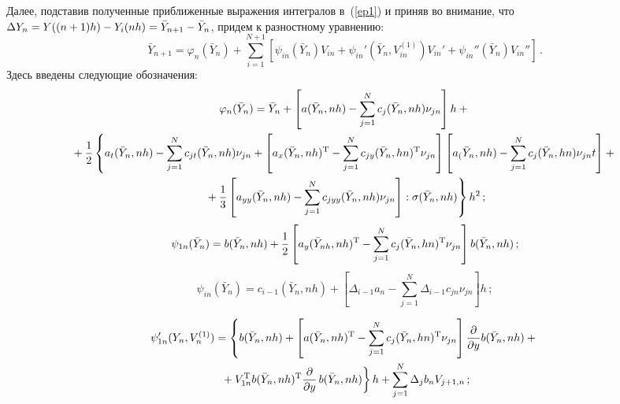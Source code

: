 {Далее, подставив полученные приближенные выражения интегралов в~(\ref{ep1}) и приняв во внимание, что $\Delta
Y_n\hm=Y((n+1)h)\hm-Y_i(nh)\hm=\bar Y_{n+1}\hm-\bar Y_ n$,
придем к разностному уравнению:
    \begin{equation}
    \bar Y_{n+1}=\varphi_n(\bar Y_n)+\sum\limits_{i=1}^{N+1}
    \left[\psi_{in}(\bar Y_n)V_{in}+
    \psi_{in}'(\bar Y_n,V_{in}^{(1)})V_{in}'+\psi_{in}''({\bar
    Y}_n)V_{in}''\right]\,.\label{ep20}
    \end{equation}
Здесь введены следующие обозначения:
    \begin{multline}
    \varphi_n(\bar Y_n)=\bar Y_n+\left[a(\bar Y_n,nh)-\sum\limits_{j=1}^N
    c_j(\bar Y_n,nh)\nu_{jn} \right]h+{}\\
    {}+\displaystyle\frac{\displaystyle 1\mathstrut}{\displaystyle 2\mathstrut}\left\{a_t(\bar Y_n,nh)-\sum\limits_{j=1}^N c_{jt}(\bar Y_n,nh)\nu_{jn}+
    \left[a_x(\bar Y_n,nh)^{\mathrm{T}}-
    \sum\limits_{j=1}^N c_{jy}(\bar Y_n,hn)^{\mathrm{T}} \nu_{jn}\right]
    \left[a_(\bar Y_n,nh)- \sum\limits_{j=1}^N c_j(\bar Y_n,hn) \nu_{jn}t\right]+{}\right.\\
    \left.{}+\displaystyle\frac{\displaystyle 1\mathstrut}{\displaystyle 3\mathstrut}\left[a_{yy}(\bar Y_n,nh)-\sum_{j=1}^N
    c_{jyy}(\bar Y_n,nh)\nu_{jn}\right]:\sigma(\bar Y_n,nh)\right\}h^2\,;
\label{ep21}
\end{multline}
    \begin{equation}
    \psi_{1n}(\bar Y_n)=b(\bar Y_n,nh)+\displaystyle\frac{\displaystyle 1\mathstrut}{\displaystyle 2\mathstrut}\left[a_y(\bar Y_{nh},nh)^{\mathrm{T}}-
    \sum_{j=1}^N c_j(\bar Y_n,hn)^{\mathrm{T}} \nu_{jn}\right] b(\bar
    Y_n,nh)\,;\label{ep22}
    \end{equation}
\begin{equation}
\psi_{in}(\bar Y_n)=c_{i-1}(\bar Y_n,nh)+\left[\Delta_{i-1}a_n-\sum_{j=1}^N
    \Delta_{i-1}c_{jn}\nu_{jn}\right]h\,;\label{ep23}
    \end{equation}
    
    \vspace*{-12pt}
    
    \noindent
    \begin{multline}
    \psi_{1n}'(Y_n,V_n^{(1)})=\left\{b(\bar Y_n,nh)+
    \left[a(\bar Y_n,nh)^{\mathrm{T}}-
    \sum\limits_{j=1}^N c_j(\bar Y_n,hn)^{\mathrm{T}} \nu_{jn}\right]\displaystyle\frac{\displaystyle \partial\mathstrut}{\displaystyle \partial y\mathstrut} b(\bar Y_n,nh)+{}\right.\\
\left.{}+V_{1n}^{\mathrm{T}} b(\bar Y_n,nh)^{\mathrm{T}}\displaystyle\frac{\displaystyle \partial\mathstrut}{\displaystyle \partial y\mathstrut}\, b(\bar Y_n,nh)
    \right\}h+\sum\limits_{j=1}^N \Delta_j b_{n}V_{j+1,n}\,;\label{ep24}
    \end{multline}
    
}
